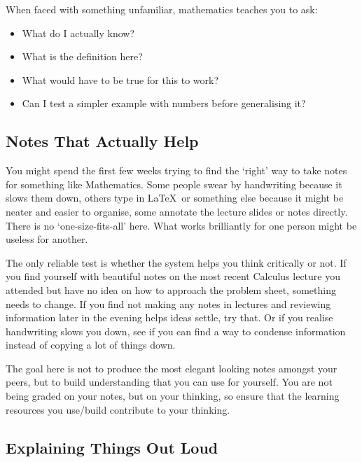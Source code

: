 When faced with something unfamiliar, mathematics teaches you to ask: 
\begin{itemize}
    \item What do I actually know? 
    \item What is the definition here? 
    \item What would have to be true for this to work? 
    \item Can I test a simpler example with numbers before generalising it? 
\end{itemize}


\subsection{Notes That Actually Help}

You might spend the first few weeks trying to find the `right' way to take notes for something like Mathematics. Some people swear by handwriting because it slows them down, others type in \LaTeX \ or something else because it might be neater and easier to organise, some annotate the lecture slides or notes directly. There is no `one-size-fits-all' here. What works brilliantly for one person might be useless for another. 

The only reliable test is whether the system helps you think critically or not. If you find yourself with beautiful notes on the most recent Calculus lecture you attended but have no idea on how to approach the problem sheet, something needs to change. If you find not making any notes in lectures and reviewing information later in the evening helps ideas settle, try that. Or if you realise handwriting slows you down, see if you can find a way to condense information instead of copying a lot of things down. 

The goal here is not to produce the most elegant looking notes amongst your peers, but to build understanding that you can use for yourself. You are not being graded on your notes, but on your thinking, so ensure that the learning resources you use/build contribute to your thinking. 

\subsection{Explaining Things Out Loud}

